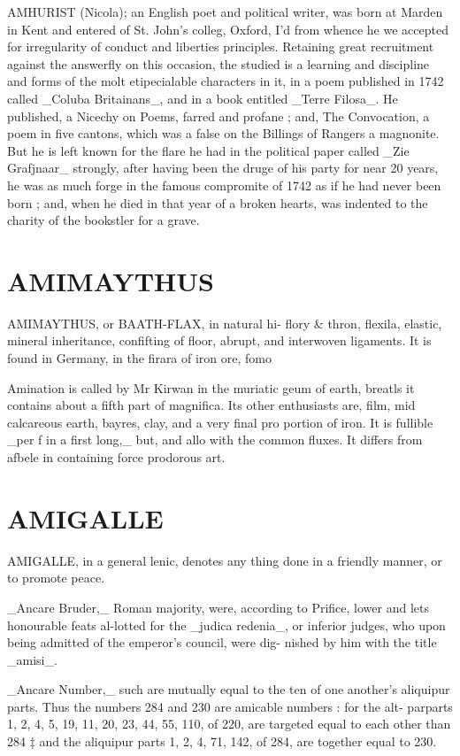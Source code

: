 \documentclass{article}
\begin{document}
AMHURIST (Nicola); an English poet and political writer, was born at Marden in Kent and entered of St. John's colleg, Oxford, I’d from whence he we accepted for irregularity of conduct and liberties principles. Retaining great recruitment against the answerfly on this occasion, the studied is a learning and discipline and forms of the molt etipecialable characters in it, in a poem published in 1742 called \_Coluba Britainans\_, and in a book entitled \_Terre Filosa\_. He published, a Nicechy on Poems, farred and profane ; and, The Convocation, a poem in five cantons, which was a false on the Billings of Rangers a magnonite. But he is left known for the flare he had in the political paper called \_Zie Grafjnaar\_ strongly, after having been the druge of his party for near 20 years, he was as much forge in the famous compromite of 1742 as if he had never been born ; and, when he died in that year of a broken hearts, was indented to the charity of the bookstler for a grave.

\section*{AMIMAYTHUS}
AMIMAYTHUS, or BAATH-FLAX, in natural hi- flory \& thron, flexila, elastic, mineral inheritance, confifting of floor, abrupt, and interwoven ligaments. It is found in Germany, in the firara of iron ore, fomo

Amination is called by Mr Kirwan in the muriatic geum of earth, breatls it contains about a fifth part of magnifica. Its other enthusiasts are, film, mid calcareous earth, bayres, clay, and a very final pro portion of iron. It is fullible \_per f in a first long,\_ but, and allo with the common fluxes. It differs from afbele in containing force prodorous art.

\section*{AMIGALLE}
AMIGALLE, in a general lenic, denotes any thing done in a friendly manner, or to promote peace.

\_Ancare Bruder,\_ Roman majority, were, according to Prifice, lower and lets honourable feats al-lotted for the \_judica redenia\_, or inferior judges, who upon being admitted of the emperor's council, were dig- nished by him with the title \_amisi\_.

\_Ancare Number,\_ such are mutually equal to the ten of one another’s aliquipur parts. Thus the numbers 284 and 230 are amicable numbers : for the alt- parparts 1, 2, 4, 5, 19, 11, 20, 23, 44, 55, 110, of 220, are targeted equal to each other than 284 ‡ and the aliquipur parts 1, 2, 4, 71, 142, of 284, are together equal to 230.
\end{document}
